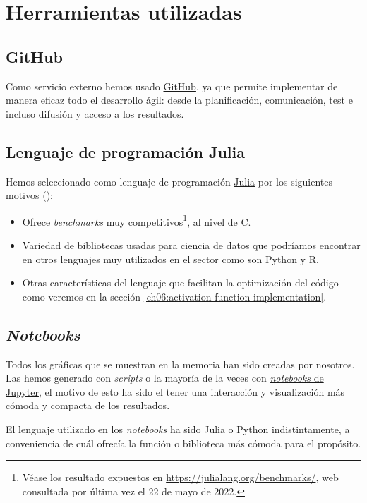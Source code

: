 
\section{Herramientas utilizadas}

\subsection{GitHub}
Como servicio externo hemos usado \href{https://github.com}{GitHub}, ya que permite implementar de manera eficaz
 todo el desarrollo ágil: 
desde la planificación, comunicación, test e incluso difusión y acceso a los resultados. 

\subsection{Lenguaje de programación Julia}
Hemos seleccionado como lenguaje de programación \href{https://julialang.org}{Julia} 
por los siguientes motivos (\cite{virtudes-de-julia}): 
\begin{itemize}
    \item Ofrece \textit{benchmarks} 
    muy competitivos\footnote{Véase los resultado expuestos en 
    \url{https://julialang.org/benchmarks/}, 
    web consultada por última vez el 22 de mayo de 2022.},
    al nivel de C.
    \item Variedad de bibliotecas usadas para ciencia de datos que podríamos encontrar 
    en otros lenguajes muy utilizados en el sector como son Python y R. 
    \item Otras características del lenguaje que facilitan 
    la optimización del código como veremos en la sección \ref{ch06:activation-function-implementation}. 
\end{itemize}

\subsection{\textit{Notebooks}}

Todos los gráficas que se muestran en la memoria han sido creadas por nosotros. 
Las hemos generado con \textit{scripts} o la mayoría de la veces con 
\href{https://jupyter.org}{\textit{notebooks} de Jupyter}, el motivo de esto ha 
sido el tener una interacción y visualización más cómoda y compacta de los resultados.

El lenguaje utilizado en los \textit{notebooks} ha sido Julia o Python indistintamente,
a conveniencia de cuál ofrecía la función o biblioteca más cómoda para el propósito.  


 